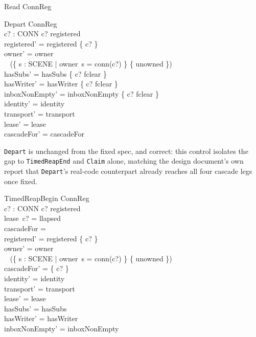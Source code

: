 \documentclass[a4paper,10pt,fleqn]{article}
\begin{document}
\begin{schema}{Read}
  \Xi ConnReg
\end{schema}

\begin{schema}{Depart}
  \Delta ConnReg \\
  c? : CONN
\where
  c? \in registered \\
  registered' = registered \setminus \{ c? \} \\
  owner' = owner \oplus \\
  \quad~ (\{ s : SCENE | owner~s = conn(c?) \} \cross \{ unowned \}) \\
  hasSubs' = hasSubs \oplus \{ c? \mapsto fclear \} \\
  hasWriter' = hasWriter \oplus \{ c? \mapsto fclear \} \\
  inboxNonEmpty' = inboxNonEmpty \oplus \{ c? \mapsto fclear \} \\
  identity' = identity \\
  transport' = transport \\
  lease' = lease \\
  cascadeFor' = cascadeFor
\end{schema}

\texttt{Depart} is unchanged from the fixed spec, and correct: this
control isolates the gap to \texttt{TimedReapEnd} and \texttt{Claim}
alone, matching the design document's own report that \texttt{Depart}'s
real-code counterpart already reaches all four cascade legs once fixed.

\begin{schema}{TimedReapBegin}
  \Delta ConnReg \\
  c? : CONN
\where
  c? \in registered \\
  lease~c? = llapsed \\
  cascadeFor = \emptyset \\
  registered' = registered \setminus \{ c? \} \\
  owner' = owner \oplus \\
  \quad~ (\{ s : SCENE | owner~s = conn(c?) \} \cross \{ unowned \}) \\
  cascadeFor' = \{ c? \} \\
  identity' = identity \\
  transport' = transport \\
  lease' = lease \\
  hasSubs' = hasSubs \\
  hasWriter' = hasWriter \\
  inboxNonEmpty' = inboxNonEmpty
\end{schema}
\end{document}
